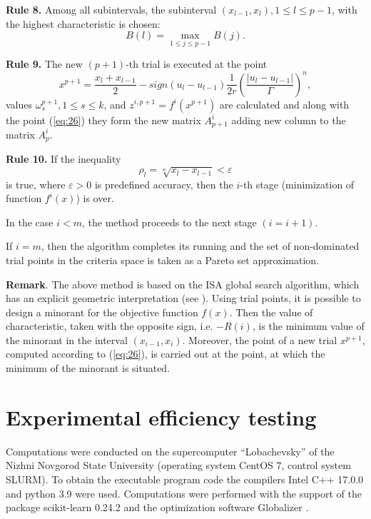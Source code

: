 \documentclass[runningheads]{llncs}
\begin{document}
\textbf{Rule 8.} Among all subintervals, the subinterval $(x_{l-1}, x_l), 1 \leq l \leq p-1$, with the highest characteristic is chosen:
\begin{equation}
    \label{eq:25}
    B(l) = \max_{1 \leq j \leq p-1} {B(j)}.
\end{equation}

\textbf{Rule 9.} The new $(p+1)$-th trial is executed at the point  
\begin{equation}
    \label{eq:26}
    x^{p+1} = \frac{x_l + x_{l-1}}{2} - sign(u_l - u_{l-1}) \frac{1}{2r} \left(\frac{|u_l - u_{l-1}|}{\Gamma} \right)^n,
\end{equation}
values $\omega^{p+1}_s, 1 \leq s \leq k$, and $z^{i,p+1}=f^i(x^{p+1})$  are calculated and along with the point (\ref{eq:26}) they form the new matrix $A^i_{p+1}$ adding new column to the matrix $A^i_p$. 

\textbf{Rule 10.} If the inequality
\begin{equation}
    \label{eq:27}
    \rho_l=\sqrt[n]{x_l-x_{l-1}} < \varepsilon
\end{equation}
is true, where $\varepsilon > 0$ is predefined accuracy, then the $i$-th  stage (minimization of function $f^i(x)$) is over.

In the case $i < m$, the method proceeds to the next stage $(i = i+1)$.  

If $i=m$, then the algorithm completes its running and the set of non-dominated trial points in the criteria space is taken as a Pareto set approximation.

\textbf{Remark}. The above method is based on the ISA  global search algorithm, which has an explicit geometric interpretation (see \cite{Strongin2000}). Using trial points, it is possible to design a minorant for the objective function $f(x)$. Then the value of characteristic, taken with the opposite sign, i.e. $-R(i)$, is the minimum value of the minorant in the interval $(x_{i-1}, x_i)$. Moreover, the point of a new trial $x^{p+1}$, computed according to (\ref{eq:26}), is carried out at the point, at which the minimum of the minorant is situated.

\section{Experimental efficiency testing}\label{sec:4}

Computations were conducted on the supercomputer ``Lobachevsky'' of the Nizhni Novgorod State University (operating system CentOS 7, control system SLURM). %
To obtain the executable program code the compilers Intel C++ 17.0.0 and python 3.9 were used. Computations were performed with the support of the package scikit-learn 0.24.2 and the optimization software Globalizer \cite{globalizerSystem}.
\end{document}
